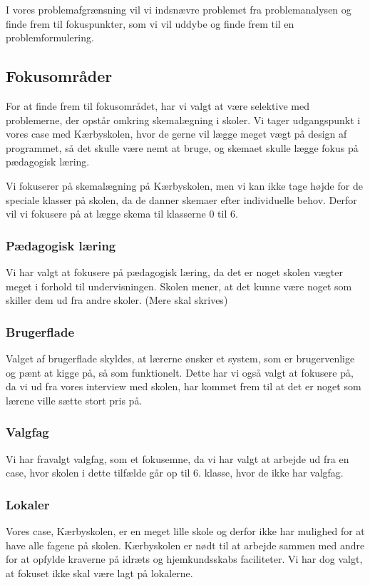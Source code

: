 
I vores problemafgrænsning vil vi indsnævre problemet fra problemanalysen og finde frem til fokuspunkter, som vi vil uddybe og finde frem til en problemformulering.

\subsection{Fokusområder}
For at finde frem til fokusområdet, har vi valgt at være selektive med problemerne, der opstår omkring skemalægning i skoler. Vi tager udgangspunkt i vores case med Kærbyskolen, hvor de gerne vil lægge meget vægt på design af programmet, så det skulle være nemt at bruge, og skemaet skulle lægge fokus på pædagogisk læring. 

Vi fokuserer på skemalægning på Kærbyskolen, men vi kan ikke tage højde for de speciale klasser på skolen, da de danner skemaer efter individuelle behov. Derfor vil vi fokusere på at lægge skema til klasserne 0 til 6.

\subsubsection{Pædagogisk læring}
Vi har valgt at fokusere på pædagogisk læring, da det er noget skolen vægter meget i forhold til undervisningen. Skolen mener, at det kunne være noget som skiller dem ud fra andre skoler.
(Mere skal skrives)

\subsubsection{Brugerflade}
Valget af brugerflade skyldes, at lærerne ønsker et system, som er brugervenlige og pænt at kigge på, så som funktionelt. Dette har vi også valgt at fokusere på, da vi ud fra vores interview med skolen, har kommet frem til at det er noget som lærene ville sætte stort pris på.

\subsubsection{Valgfag}
Vi har fravalgt valgfag, som et fokusemne, da vi har valgt at arbejde ud fra en case, hvor skolen i dette tilfælde går op til 6. klasse, hvor de ikke har valgfag.

\subsubsection{Lokaler}
Vores case, Kærbyskolen, er en meget lille skole og derfor ikke har mulighed for at have alle fagene på skolen. Kærbyskolen er nødt til at arbejde sammen med andre for at opfylde kraverne på idræts og hjemkundsskabs faciliteter. Vi har dog valgt, at fokuset ikke skal være lagt på lokalerne.

